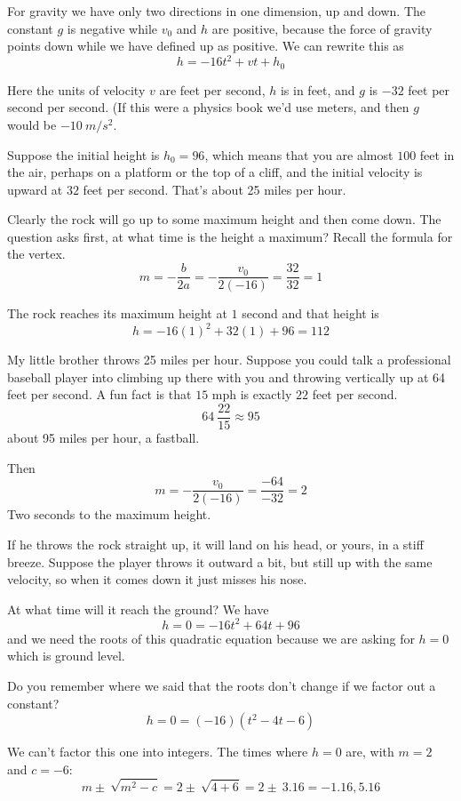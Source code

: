 \documentclass[11pt, oneside]{article}
\begin{document}
For gravity we have only two directions in one dimension, up and down.  The constant $g$ is negative while $v_0$ and $h$ are positive, because the force of gravity points down while we have defined up as positive.  We can rewrite this as
\[ h = -16t^2 + vt + h_0 \]

Here the units of velocity $v$ are feet per second, $h$ is in feet, and $g$ is $-32$ feet per second per second.  (If this were a physics book we'd use meters, and then $g$ would be $-10 \ m/s^2$.

Suppose the initial height is $h_0 = 96$, which means that you are almost $100$ feet in the air, perhaps on a platform or the top of a cliff, and the initial velocity is upward at $32$ feet per second.  That's about 25 miles per hour.

Clearly the rock will go up to some maximum height and then come down.  The question asks first, at what time is the height a maximum?  Recall the formula for the vertex.
\[ m = -\frac{b}{2a} = -\frac{v_0}{2(-16)} = \frac{32}{32} = 1 \]

The rock reaches its maximum height at $1$ second and that height is
\[ h = -16(1)^2 + 32(1) + 96 = 112 \]

My little brother throws 25 miles per hour.  Suppose you could talk a professional baseball player into climbing up there with you and throwing vertically up at 64 feet per second.  A fun fact is that $15$ mph is exactly $22$ feet per second.
\[ 64 \ \frac{22}{15} \approx 95 \]
about 95 miles per hour, a fastball.

Then
\[ m = - \frac{v_0}{2(-16)} = \frac{-64}{-32} = 2 \]
Two seconds to the maximum height.

If he throws the rock straight up, it will land on his head, or yours, in a stiff breeze.  Suppose the player throws it outward a bit, but still up with the same velocity, so when it comes down it just misses his nose.  

At what time will it reach the ground?  We have
\[ h = 0 = -16t^2 + 64t + 96 \]
and we need the roots of this quadratic equation because we are asking for $h = 0$ which is ground level.

Do you remember where we said that the roots don't change if we factor out a constant?
\[ h = 0 = (-16)(t^2 - 4t - 6) \]

We can't factor this one into integers.  The times where $h = 0$ are, with $m = 2$ and $c = -6$:
\[ m \pm \ \sqrt{m^2 - c} = 2 \pm \ \sqrt{4 + 6} = 2 \pm \ 3.16 = - 1.16, 5.16 \]
\end{document}
